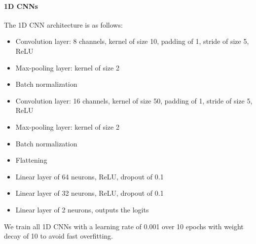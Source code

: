 \documentclass[10pt,conference,compsocconf]{IEEEtran}
\begin{document}
\paragraph{1D CNNs}
The 1D CNN architecture is as follows:
\begin{itemize}
  \item Convolution layer: 8 channels, kernel of size 10, padding of 1, stride of size 5, ReLU
  \item Max-pooling layer: kernel of size 2
  \item Batch normalization
  \item Convolution layer: 16 channels, kernel of size 50, padding of 1, stride of size 5, ReLU
  \item Max-pooling layer: kernel of size 2
  \item Batch normalization
  \item Flattening
  \item Linear layer of 64 neurons, ReLU, dropout of 0.1
  \item Linear layer of 32 neurons, ReLU, dropout of 0.1
  \item Linear layer of 2 neurons, outputs the logits
\end{itemize}
We train all 1D CNNs with a learning rate of 0.001 over 10 epochs with weight decay of 10 to avoid fast overfitting.

\newpage



\end{document}
